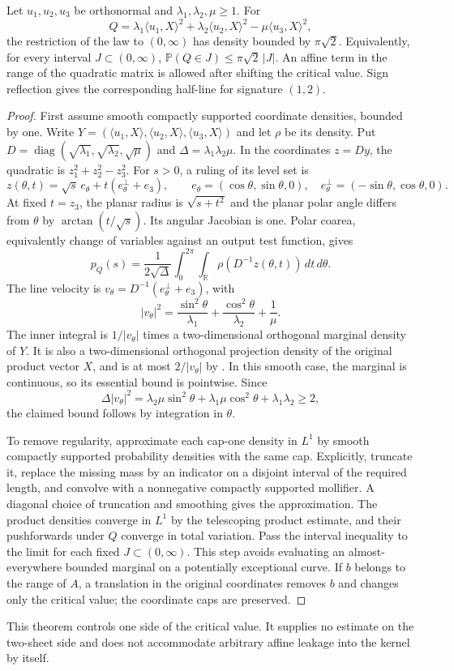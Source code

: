 \begin{theorem}\label{geom:ruled}
Let $u_1,u_2,u_3$ be orthonormal and $\lambda_1,\lambda_2,\mu\ge1$. For
\[
 Q=\lambda_1\langle u_1,X\rangle^2+
   \lambda_2\langle u_2,X\rangle^2-\mu\langle u_3,X\rangle^2,
\]
the restriction of the law to $(0,\infty)$ has density bounded by $\pi\sqrt2$. Equivalently, for every interval $J\subset(0,\infty)$,
$\mathbb P(Q\in J)\le\pi\sqrt2\,|J|$.
An affine term in the range of the quadratic matrix is allowed after shifting the critical value. Sign reflection gives the corresponding half-line for signature $(1,2)$.
\end{theorem}
\begin{proof}
First assume smooth compactly supported coordinate densities, bounded by one. Write $Y=(\langle u_1,X\rangle,\langle u_2,X\rangle,\langle u_3,X\rangle)$ and let $\rho$ be its density. Put $D=\operatorname{diag}(\sqrt{\lambda_1},\sqrt{\lambda_2},\sqrt\mu)$ and $\Delta=\lambda_1\lambda_2\mu$. In the coordinates $z=Dy$, the quadratic is $z_1^2+z_2^2-z_3^2$. For $s>0$, a ruling of its level set is
\[
 z(\theta,t)=\sqrt s\,e_\theta+t(e_\theta^\perp+e_3),\qquad
 e_\theta=(\cos\theta,\sin\theta,0),\quad
 e_\theta^\perp=(-\sin\theta,\cos\theta,0).
\]
At fixed $t=z_3$, the planar radius is $\sqrt{s+t^2}$ and the planar polar angle differs from $\theta$ by $\arctan(t/\sqrt s)$. Its angular Jacobian is one. Polar coarea, equivalently change of variables against an output test function, gives
\[
 p_Q(s)=\frac1{2\sqrt\Delta}\int_0^{2\pi}\int_{\mathbb R}
 \rho(D^{-1}z(\theta,t))\,dt\,d\theta.
\]
The line velocity is $v_\theta=D^{-1}(e_\theta^\perp+e_3)$, with
\[
 |v_\theta|^2=\frac{\sin^2\theta}{\lambda_1}+
 \frac{\cos^2\theta}{\lambda_2}+\frac1\mu.
\]
The inner integral is $1/|v_\theta|$ times a two-dimensional orthogonal marginal density of $Y$. It is also a two-dimensional orthogonal projection density of the original product vector $X$, and is at most $2/|v_\theta|$ by \citet{LPP2016}. In this smooth case, the marginal is continuous, so its essential bound is pointwise. Since
\[
 \Delta |v_\theta|^2=\lambda_2\mu\sin^2\theta+
 \lambda_1\mu\cos^2\theta+\lambda_1\lambda_2\ge2,
\]
the claimed bound follows by integration in $\theta$.

To remove regularity, approximate each cap-one density in $L^1$ by smooth compactly supported probability densities with the same cap. Explicitly, truncate it, replace the missing mass by an indicator on a disjoint interval of the required length, and convolve with a nonnegative compactly supported mollifier. A diagonal choice of truncation and smoothing gives the approximation. The product densities converge in $L^1$ by the telescoping product estimate, and their pushforwards under $Q$ converge in total variation. Pass the interval inequality to the limit for each fixed $J\subset(0,\infty)$. This step avoids evaluating an almost-everywhere bounded marginal on a potentially exceptional curve. If $b$ belongs to the range of $A$, a translation in the original coordinates removes $b$ and changes only the critical value; the coordinate caps are preserved.
\end{proof}

This theorem controls one side of the critical value. It supplies no estimate on the two-sheet side and does not accommodate arbitrary affine leakage into the kernel by itself.
